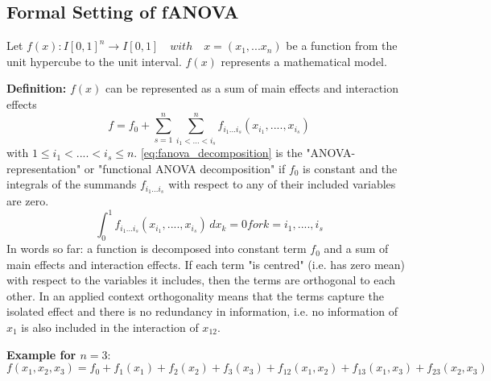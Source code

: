 \subsection*{Formal Setting of fANOVA}
Let $f(x): I[0,1]^n \rightarrow I[0,1] \quad with \quad x = (x_1, ... x_n) $ be a function from the unit hypercube to the unit interval. $f(x)$ represents a mathematical model.\par
\textbf{Definition:} $f(x)$ can be represented as a sum of main effects and interaction effects
\begin{equation}
    f = f_0 + \sum_{s=1}^{n} \sum_{i_1 <...<i_s}^{n} f_{i_{1}...i_{s}} (x_{i_{1}} , ....,x_{i_{s}})
    \label{eq:fanova_decomposition}
\end{equation}
with $1 \leq i_1 < .... < i_s \leq n$.
\autoref{eq:fanova_decomposition} is the "ANOVA-representation" \cite{sobol_global_2001} or "functional ANOVA decomposition" \cite{hooker_discovering_2004} if $f_0$ is constant and the integrals of the summands $f_{i_{1}...i_{s}}$ with respect to any of their included variables are zero.
\begin{equation}
    \int_{0}^{1} f_{i_{1}...i_{s}} (x_{i_{1}}, ...., x_{i_{s}}) \, dx_k = 0 for k = i_1, ...., i_s
    \label{eq:zero_mean_condition}
\end{equation}
In words so far: a function is decomposed into constant term $f_0$ and a sum of main effects and interaction effects. If each term "is centred" (i.e. has zero mean) with respect to the variables it includes, then the terms are orthogonal to each other. In an applied context orthogonality means that the terms capture the isolated effect and there is no redundancy in information, i.e. no information of $x_1$ is also included in the interaction of $x_{12}$.\par
\textbf{Example for $n=3$}:
\begin{equation}
    f(x_1,x_2,x_3) = f_0 + f_{1}(x_1) + f_{2}(x_2) + f_{3}(x_3) + f_{12}(x_1,x_2) + f_{13}(x_1,x_3) + f_{23}(x_2,x_3)
    \label{eq:fanova_decomposition_example}
\end{equation}

